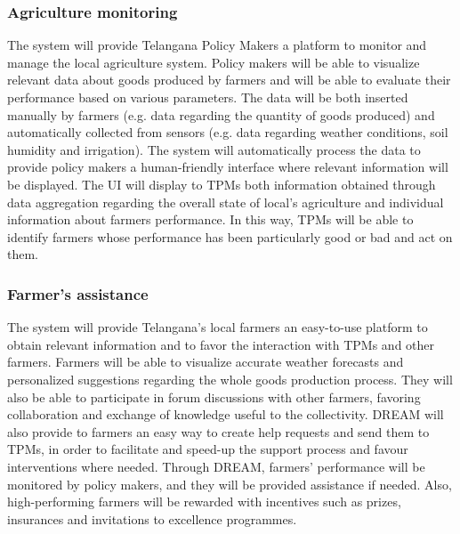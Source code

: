 \documentclass[10pt]{article}
\begin{document}
\subsubsection{Agriculture monitoring}
The system will provide Telangana Policy Makers a platform to monitor and manage the local 
agriculture system. Policy makers will be able to visualize relevant data about goods produced by farmers
and will be able to evaluate their performance based on various parameters. The data will be both inserted manually by farmers
(e.g. data regarding the quantity of goods produced) and automatically collected from sensors (e.g. data regarding weather conditions,
soil humidity and irrigation). The system will automatically process the data to provide policy makers a human-friendly
interface where relevant information will be displayed. The UI will display to TPMs both information obtained through data 
aggregation regarding the overall state of local's agriculture and individual information about farmers performance.
In this way, TPMs will be able to identify farmers whose performance has been particularly good or bad and act on them.
\subsubsection{Farmer's assistance}
The system will provide Telangana's local farmers an easy-to-use platform to obtain relevant information and to favor the interaction with TPMs and other farmers.
Farmers will be able to visualize accurate weather forecasts and personalized suggestions regarding the whole goods production process. They will also be able to 
participate in forum discussions with other farmers, favoring collaboration and exchange of knowledge useful to the collectivity.
DREAM will also provide to farmers an easy way to create help requests and send them to TPMs, in order to facilitate and speed-up the support process and favour
interventions where needed. 
Through DREAM, farmers' performance will be monitored by policy makers, and they will be provided assistance if needed. Also, high-performing farmers will be rewarded
with incentives such as prizes, insurances and invitations to excellence programmes.
\end{document}
